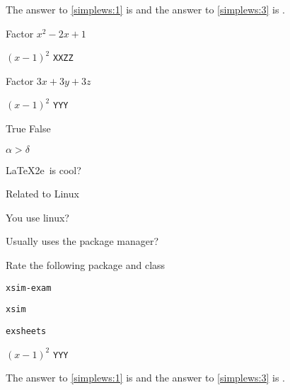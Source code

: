 \documentclass{article}
\begin{document}
The answer to \ref{simplews:1} is  and the answer
to \ref{simplews:3} is .


\begin{enumext}[save-ans=simplews,resume, columns=2,check-ans=true,show-ans=true,nosep,save-ref=true,wrap-label={\tikz[scale=0.25]\duck[signpost=\scalebox{0.6}{#1}];}]
  \item Factor $x^{2}-2x+1$
    \begin{anskey*}
    $\left(x-1\right)^{2}$ \verb+XXZZ+
    \end{anskey*}

  \item Factor $3x+3y+3z$
    \begin{anskey*}
    $\left(x-1\right)^{2}$ \verb+YYY+
    \end{anskey*}
  \item True False
    \begin{enumext}[nosep]
      \item $\alpha > \delta$ 
      \item \LaTeX2e\ is cool? 
    \end{enumext}
  \item Related to Linux
    \begin{enumext}[nosep]
      \item You use linux? 
      \item Usually uses the package manager? 
      \item Rate the following package and class
        \begin{enumext}[nosep]
          \item \texttt{xsim-exam} 
          \item \texttt{xsim} 
          \item \texttt{exsheets}     \begin{anskey*}
    $\left(x-1\right)^{2}$ \verb+YYY+
    \end{anskey*}
        \end{enumext}
    \end{enumext}
\end{enumext}

The answer to \ref{simplews:1} is  and the answer
to \ref{simplews:3} is .

\end{document}
